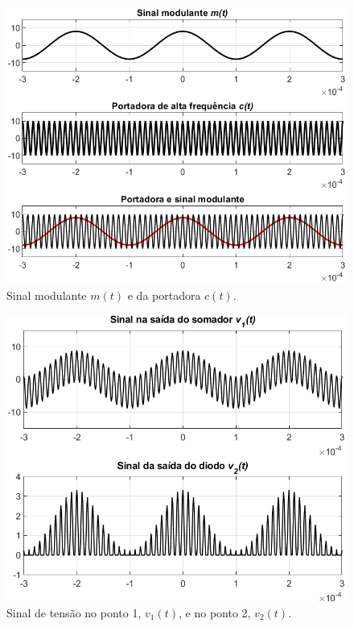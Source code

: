\documentclass[a4paper,12pt,oneside,openany,table,xcdraw]{article}
\begin{document}
\vspace{0.5cm}
\begin{figure}[H]
\centering
\includegraphics[width=\textwidth]{ex1}
\caption{Sinal modulante $m(t)$ e da portadora $c(t)$.}
\label{1:sinais}
\end{figure}

\vspace{0.3cm}
\begin{figure}[H]
\centering
\includegraphics[width=\textwidth]{ex1_v1_v2}
\caption{Sinal de tensão no ponto 1, $v_1(t)$, e no ponto 2, $v_2(t)$.}
\label{1:v1_v2}
\end{figure}
\end{document}
